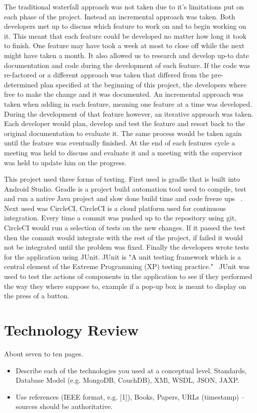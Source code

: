 The traditional waterfall approach was not taken due to it's limitations put on each phase of the project. Instead an incremental approach was taken. Both developers met up to discuss which feature to work on and to begin working on it. This meant that each feature could be developed no matter how long it took to finish. One feature may have took a week at most to close off while the next might have taken a month. It also allowed us to research and develop up-to date documentation and code during the development of each feature. If the code was re-factored or a different approach was taken that differed from the pre-determined plan specified at the beginning of this project, the developers where free to make the change and it was documented. An incremental approach was taken when adding in each feature, meaning one feature at a time was developed. During the development of that feature however, an iterative approach was taken. Each developer would plan, develop and test the feature and resort back to the original documentation to evaluate it. The same process would be taken again until the feature was eventually finished. At the end of each features cycle a meeting was held to discuss and evaluate it and a meeting with the supervisor was held to update him on the progress.

This project used three forms of testing. First used is gradle that is built into Android Studio. Gradle is a project build automation tool used to compile, test and run a native Java project and slow done build time and code freeze ups ~\cite{gradle}. Next used was CircleCI, CircleCI is a cloud platform used for continuous integration. Every time a commit was pushed up to the repository using git, CircleCI would run a selection of tests on the new changes. If it passed the test then the commit would integrate with the rest of the project, if failed it would not be integrated until the problem was fixed. Finally the developers wrote tests for the application using JUnit. JUnit is "A unit testing framework which is a central element of the Extreme Programming (XP) testing practice."~\cite{junit} JUnit was used to test the actions of components in the application to see if they performed the way they where suppose to, example if a pop-up box is meant to display on the press of a button. 

\chapter{Technology Review}
About seven to ten pages.
\begin{itemize}
\item Describe each of the technologies you used at a conceptual level. Standards, Database Model (e.g. MongoDB, CouchDB), XMl, WSDL, JSON, JAXP.
\item Use references (IEEE format, e.g. [1]), Books, Papers, URLs (timestamp) – sources should be authoritative. 
\end{itemize}


